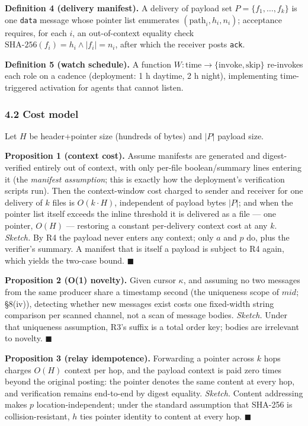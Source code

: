 \documentclass[journal]{IEEEtran}
\begin{document}
\textbf{Definition 4 (delivery manifest).} A delivery of payload set
\(P = \{f_1, \dots, f_k\}\) is one \texttt{data} message whose pointer
list enumerates \((\text{path}_i, h_i, n_i)\); acceptance requires, for
each \(i\), an out-of-context equality check
\(\text{SHA-256}(f_i) = h_i \land |f_i| = n_i\), after which the
receiver posts \texttt{ack}.

\textbf{Definition 5 (watch schedule).} A function
\(W: \text{time} \to \{\text{invoke}, \text{skip}\}\) re-invokes each
role on a cadence (deployment: 1 h daytime, 2 h night), implementing
time-triggered activation for agents that cannot listen.

\hypertarget{cost-model}{%
\subsubsection{4.2 Cost model}\label{cost-model}}

Let \(H\) be header+pointer size (hundreds of bytes) and \(|P|\) payload
size.

\textbf{Proposition 1 (context cost).} Assume manifests are generated
and digest-verified entirely out of context, with only per-file
boolean/summary lines entering it (the \emph{manifest assumption}; this
is exactly how the deployment's verification scripts run). Then the
context-window cost charged to sender and receiver for one delivery of
\(k\) files is \(O(k \cdot H)\), independent of payload bytes \(|P|\);
and when the pointer list itself exceeds the inline threshold it is
delivered as a file --- one pointer, \(O(H)\) --- restoring a constant
per-delivery context cost at any \(k\). \emph{Sketch.} By R4 the payload
never enters any context; only \(a\) and \(p\) do, plus the verifier's
summary. A manifest that is itself a payload is subject to R4 again,
which yields the two-case bound. \(\blacksquare\)

\textbf{Proposition 2 (O(1) novelty).} Given cursor \(\kappa\), and
assuming no two messages from the same producer share a timestamp second
(the uniqueness scope of \(\mathit{mid}\); §8(iv)), detecting whether
new messages exist costs one fixed-width string comparison per scanned
channel, not a scan of message bodies. \emph{Sketch.} Under that
uniqueness assumption, R3's suffix is a total order key; bodies are
irrelevant to novelty. \(\blacksquare\)

\textbf{Proposition 3 (relay idempotence).} Forwarding a pointer across
\(k\) hops charges \(O(H)\) context per hop, and the payload context is
paid zero times beyond the original posting: the pointer denotes the
same content at every hop, and verification remains end-to-end by digest
equality. \emph{Sketch.} Content addressing makes \(p\)
location-independent; under the standard assumption that SHA-256 is
collision-resistant, \(h\) ties pointer identity to content at every
hop. \(\blacksquare\)
\end{document}
